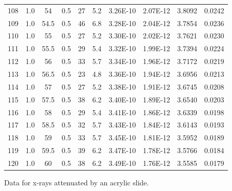 \begin{maintable}[ht]
\begin{tabular}{cccccccccc}
108       & 1.0 & 54       & 0.5         & 27    & 5.2      & 3.26E-10      & 2.07E-12         & 3.8092       & 0.0242 \\
109       & 1.0 & 54.5     & 0.5         & 46    & 6.8      & 3.28E-10      & 2.04E-12         & 3.7854       & 0.0236 \\
110       & 1.0 & 55       & 0.5         & 27    & 5.2      & 3.30E-10      & 2.02E-12         & 3.7621       & 0.0230 \\
111       & 1.0 & 55.5     & 0.5         & 29    & 5.4      & 3.32E-10      & 1.99E-12         & 3.7394       & 0.0224 \\
112       & 1.0 & 56       & 0.5         & 33    & 5.7      & 3.34E-10      & 1.96E-12         & 3.7172       & 0.0219 \\
113       & 1.0 & 56.5     & 0.5         & 23    & 4.8      & 3.36E-10      & 1.94E-12         & 3.6956       & 0.0213 \\
114       & 1.0 & 57       & 0.5         & 27    & 5.2      & 3.38E-10      & 1.91E-12         & 3.6745       & 0.0208 \\
115       & 1.0 & 57.5     & 0.5         & 38    & 6.2      & 3.40E-10      & 1.89E-12         & 3.6540       & 0.0203 \\
116       & 1.0 & 58       & 0.5         & 29    & 5.4      & 3.41E-10      & 1.86E-12         & 3.6339       & 0.0198 \\
117       & 1.0 & 58.5     & 0.5         & 32    & 5.7      & 3.43E-10      & 1.84E-12         & 3.6143       & 0.0193 \\
118       & 1.0 & 59       & 0.5         & 33    & 5.7      & 3.45E-10      & 1.81E-12         & 3.5952       & 0.0189 \\
119       & 1.0 & 59.5     & 0.5         & 39    & 6.2      & 3.47E-10      & 1.78E-12         & 3.5766       & 0.0184 \\
120       & 1.0 & 60       & 0.5         & 38    & 6.2      & 3.49E-10      & 1.76E-12         & 3.5585       & 0.0179         
\end{tabular}
\caption{Data for x-rays attenuated by an acrylic slide.}
\label{tab:xrcg6}
\end{maintable}

\AtEndDocument{\clearpage\ifodd\value{page}\else\null\clearpage\fi} %



